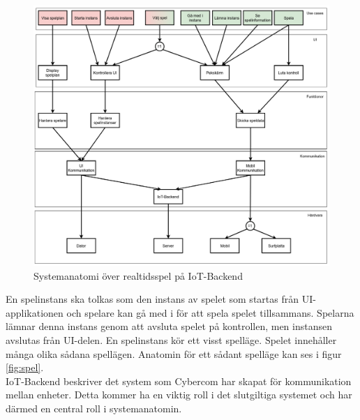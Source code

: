 \documentclass[10pt]{article}
\begin{document}
		\begin{figure}[h]
			\centering
			\includegraphics[scale=0.4]{systemanatomi_graf}
			\caption{Systemanatomi över realtidsspel på IoT-Backend}
			\label{fig:graf}
		\end{figure}
  	\pagebreak

  	En spelinstans ska tolkas som den instans av spelet som startas från UI-applikationen och spelare kan gå med i för att spela spelet tillsammans. Spelarna lämnar denna instans genom att avsluta spelet på kontrollen, men instansen avslutas från UI-delen. En spelinstans kör ett visst spelläge. Spelet innehåller många olika sådana spellägen. Anatomin för ett sådant spelläge kan ses i figur \ref{fig:spel}.\\

  	IoT-Backend beskriver det system som Cybercom har skapat för kommunikation mellan enheter. Detta kommer ha en viktig roll i det slutgiltiga systemet och har därmed en central roll i systemanatomin.\\
\end{document}
